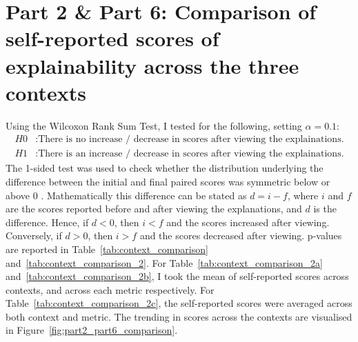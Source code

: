 \section{Part 2 \& Part 6: Comparison of self-reported scores of explainability across the three contexts}
\label{sec:three_contexts_comparison}
Using the Wilcoxon Rank Sum Test, I tested for the following, setting $\alpha = 0.1$: 
\begin{align*}
    H0&: \text{There is no increase / decrease in scores after viewing the explainations.} \\
    H1&: \text{There is an increase / decrease in scores after viewing the explainations.}
\end{align*}
The 1-sided test was used to check whether the distribution underlying the difference between the initial and final paired scores was symmetric below or above 0 \cite{scipy}. Mathematically this difference can be stated as $d = i - f$, where $i$ and $f$ are the scores reported before and after viewing the explanations, and $d$ is the difference. Hence, if $d < 0$, then $i < f$ and the scores increased after viewing. Conversely, if $d > 0$, then $i > f$ and the scores decreased after viewing. p-values are reported in Table~\ref{tab:context_comparison} and~\ref{tab:context_comparison_2}. For Table~\ref{tab:context_comparison_2a} and~\ref{tab:context_comparison_2b}, I took the mean of self-reported scores across contexts, and across each metric respectively. For Table~\ref{tab:context_comparison_2c}, the self-reported scores were averaged across both context and metric. The trending in scores across the contexts are visualised in Figure~\ref{fig:part2_part6_comparison}.

\begin{table}[!ht]
    \centering
    \caption{p-values comparing whether there was a statistically significant increase / decrease in the explainability scores before and after viewing explanations.}
    \label{tab:context_comparison}
\end{table}

